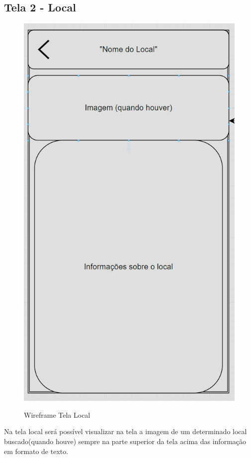 \subsection{Tela 2 - Local}
\begin{figure}[h]
  \begin{center}
  \includegraphics[width=0.2\linewidth]{images/wire-tela-local.png}\\
  \end{center}
  \caption[Wireframe Tela Local]{Wireframe Tela Local}
  \label{fig:wireframe-tela-local}
\end{figure}
Na tela local será possível visualizar na tela a imagem de um determinado local buscado(quando houve) sempre na parte superior da tela acima das informação em formato de texto. 

